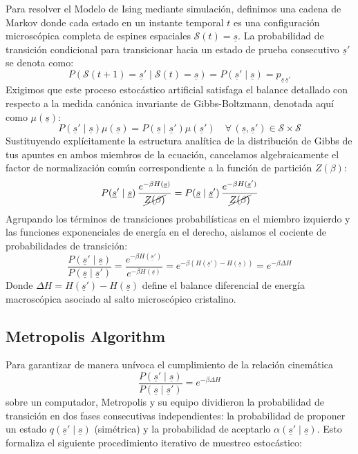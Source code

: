 \noindent Para resolver el Modelo de Ising mediante simulación, definimos una cadena de Markov donde cada estado en un instante temporal $t$ es una configuración microscópica completa de espines espaciales $\mathcal{S}(t) = \underline{s}$. La probabilidad de transición condicional para transicionar hacia un estado de prueba consecutivo $\underline{s}'$ se denota como:
\[
P(\mathcal{S}(t+1) = \underline{s}' \mid \mathcal{S}(t) = \underline{s}) = P(\underline{s}' \mid \underline{s}) = p_{\underline{s} \, \underline{s}'}
\]
Exigimos que este proceso estocástico artificial satisfaga el balance detallado con respecto a la medida canónica invariante de Gibbs-Boltzmann, denotada aquí como $\mu(\underline{s})$:
\[
P(\underline{s}' \mid \underline{s}) \mu(\underline{s}) = P(\underline{s} \mid \underline{s}') \mu(\underline{s}') \quad \forall \, (\underline{s}, \underline{s}') \in \mathcal{S} \times \mathcal{S}
\]
Sustituyendo explícitamente la estructura analítica de la distribución de Gibbs de tus apuntes en ambos miembros de la ecuación, cancelamos algebraicamente el factor de normalización común correspondiente a la función de partición $Z(\beta)$:
\[
P(\underline{s}' \mid \underline{s}) \, \frac{e^{-\beta H(\underline{s})}}{\cancel{Z(\beta)}} = P(\underline{s} \mid \underline{s}') \, \frac{e^{-\beta H(\underline{s}')}}{\cancel{Z(\beta)}}
\]
Agrupando los términos de transiciones probabilísticas en el miembro izquierdo y las funciones exponenciales de energía en el derecho, aislamos el cociente de probabilidades de transición:
\[
\frac{P(\underline{s}' \mid \underline{s})}{P(\underline{s} \mid \underline{s}')} = \frac{e^{-\beta H(\underline{s}')}}{e^{-\beta H(\underline{s})}} = e^{-\beta (H(\underline{s}') - H(\underline{s}))} = e^{-\beta \Delta H}
\]
Donde $\Delta H = H(\underline{s}') - H(\underline{s})$ define el balance diferencial de energía macroscópica asociado al salto microscópico cristalino.

\subsection{Metropolis Algorithm}

\noindent 
Para garantizar de manera unívoca el cumplimiento de la relación cinemática 
$$\frac{P(\underline{s}' \mid \underline{s})}{P(\underline{s} \mid \underline{s}')} = e^{-\beta \Delta H}$$ 
sobre un computador, Metropolis y su equipo dividieron la probabilidad de transición en dos fases consecutivas independientes: la probabilidad de proponer un estado $q(\underline{s}' \mid \underline{s})$ (simétrica) y la probabilidad de aceptarlo $\alpha(\underline{s}' \mid \underline{s})$. Esto formaliza el siguiente procedimiento iterativo de muestreo estocástico:


